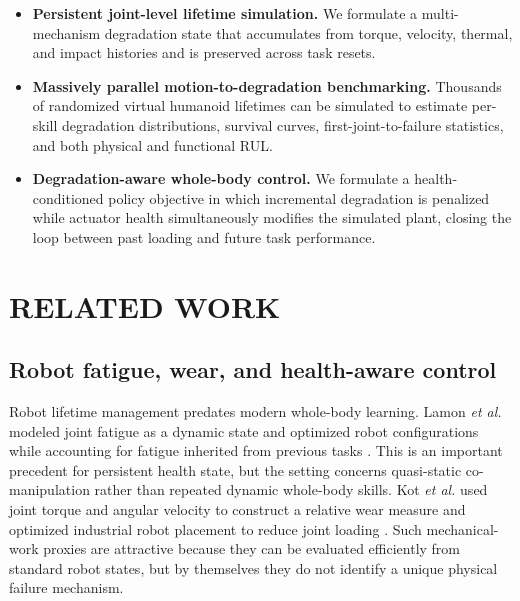 \documentclass[letterpaper,10pt,conference]{ieeeconf}
\newif\ifdraftnotes
\newcommand{\tbd}[1]{\ifdraftnotes\par\noindent\textbf{[DRAFT TODO: #1]}\par\fi}
\begin{document}
\begin{itemize}
    \item \textbf{Persistent joint-level lifetime simulation.} We formulate a multi-mechanism degradation state that accumulates from torque, velocity, thermal, and impact histories and is preserved across task resets.
    \item \textbf{Massively parallel motion-to-degradation benchmarking.} Thousands of randomized virtual humanoid lifetimes can be simulated to estimate per-skill degradation distributions, survival curves, first-joint-to-failure statistics, and both physical and functional RUL.
    \item \textbf{Degradation-aware whole-body control.} We formulate a health-conditioned policy objective in which incremental degradation is penalized while actuator health simultaneously modifies the simulated plant, closing the loop between past loading and future task performance.
\end{itemize}

\tbd{After experiments, replace this paragraph and the final abstract sentence with 3--4 quantitative headline results: number of environments/lifetimes, strongest motion-to-joint effect, RUL prediction error after calibration, and performance-vs-degradation improvement of the proposed policy.}

\section{RELATED WORK}

\subsection{Robot fatigue, wear, and health-aware control}

Robot lifetime management predates modern whole-body learning. Lamon \emph{et al.} modeled joint fatigue as a dynamic state and optimized robot configurations while accounting for fatigue inherited from previous tasks \cite{lamon2018fatigue}. This is an important precedent for persistent health state, but the setting concerns quasi-static co-manipulation rather than repeated dynamic whole-body skills. Kot \emph{et al.} used joint torque and angular velocity to construct a relative wear measure and optimized industrial robot placement to reduce joint loading \cite{kot2021wear}. Such mechanical-work proxies are attractive because they can be evaluated efficiently from standard robot states, but by themselves they do not identify a unique physical failure mechanism.
\end{document}
